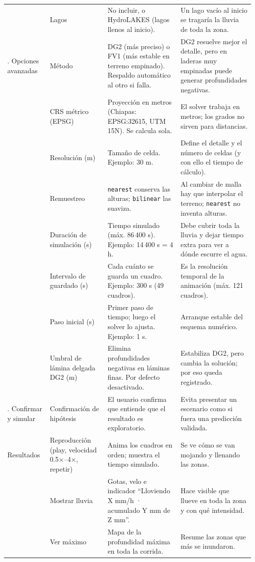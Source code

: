 \documentclass[11pt,letterpaper]{article}
\begin{document}
{\begin{longtable}{>{\raggedright\arraybackslash}p{2.1cm}>{\raggedright\arraybackslash}p{3.0cm}>{\raggedright\arraybackslash}p{5.3cm}>{\raggedright\arraybackslash}p{5.2cm}}
 & Lagos & No incluir, o HydroLAKES (lagos llenos al inicio). & Un lago vacío al inicio se tragaría la lluvia de toda la zona.\\
4. Opciones avanzadas & Método & DG2 (más preciso) o FV1 (más estable en terreno empinado). Respaldo automático al otro si falla. & DG2 resuelve mejor el detalle, pero en laderas muy empinadas puede generar profundidades negativas.\\
 & CRS métrico (EPSG) & Proyección en metros (Chiapas: EPSG:32615, UTM 15N). Se calcula sola. & El solver trabaja en metros; los grados no sirven para distancias.\\
 & Resolución (m) & Tamaño de celda. Ejemplo: 30 m. & Define el detalle y el número de celdas (y con ello el tiempo de cálculo).\\
 & Remuestreo & \texttt{nearest} conserva las alturas; \texttt{bilinear} las suaviza. & Al cambiar de malla hay que interpolar el terreno; \texttt{nearest} no inventa alturas.\\
 & Duración de simulación (s) & Tiempo simulado (máx. 86\,400 s). Ejemplo: 14\,400 s = 4 h. & Debe cubrir toda la lluvia y dejar tiempo extra para ver a dónde escurre el agua.\\
 & Intervalo de guardado (s) & Cada cuánto se guarda un cuadro. Ejemplo: 300 s (49 cuadros). & Es la resolución temporal de la animación (máx. 121 cuadros).\\
 & Paso inicial (s) & Primer paso de tiempo; luego el solver lo ajusta. Ejemplo: 1 s. & Arranque estable del esquema numérico.\\
 & Umbral de lámina delgada DG2 (m) & Elimina profundidades negativas en láminas finas. Por defecto desactivado. & Estabiliza DG2, pero cambia la solución; por eso queda registrado.\\
5. Confirmar y simular & Confirmación de hipótesis & El usuario confirma que entiende que el resultado es exploratorio. & Evita presentar un escenario como si fuera una predicción validada.\\
Resultados & Reproducción (play, velocidad 0.5×–4×, repetir) & Anima los cuadros en orden; muestra el tiempo simulado. & Se ve cómo se van mojando y llenando las zonas.\\
 & Mostrar lluvia & Gotas, velo e indicador ``Lloviendo X mm/h · acumulado Y mm de Z mm''. & Hace visible que llueve en toda la zona y con qué intensidad.\\
 & Ver máximo & Mapa de la profundidad máxima en toda la corrida. & Resume las zonas que más se inundaron.\\

\end{longtable}}
\end{document}
